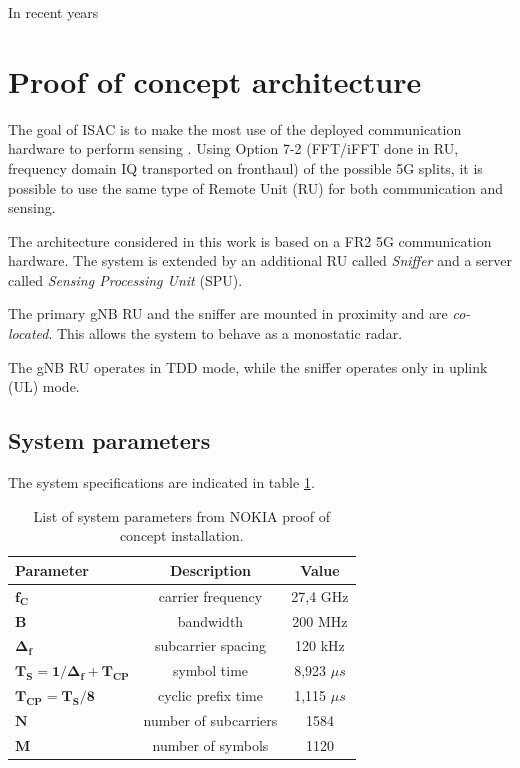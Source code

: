 	In recent years


\section{Proof of concept architecture}
	\label{sec:intro-PoCarchitecture}
	
	The goal of ISAC is to make the most use of the deployed communication hardware to perform sensing \cite{Wild_Grudnitsky_Mandelli_Henninger_Guan_Schaich_2023}. Using Option 7-2 (FFT/iFFT done in RU, frequency domain IQ transported on fronthaul) of the possible 5G splits, it is possible to use the same type of Remote Unit (RU) for both communication and sensing.
	
	The architecture considered in this work is based on a FR2 5G communication hardware. The system is extended by an additional RU called \textit{Sniffer} and a server called \textit{Sensing Processing Unit} (SPU).
	
	The primary gNB RU and the sniffer are mounted in proximity and are \textit{co-located}. This allows the system to behave as a monostatic radar.
	
	The gNB RU operates in TDD mode, while the sniffer operates only in uplink (UL) mode.
	
	\subsection{System parameters}
	
	The system specifications are indicated in table \ref{table:PoCparams}.
	
	\begin{table}[H]
		\centering 
		\begin{tabular}{|p{9em} c c |}
			\hline
			\rowcolor{bluepoli!40} %
			\textbf{Parameter} & \textbf{Description} & \textbf{Value}  \T\B \\
			\hline \hline
			$\bm{f_C}$ & carrier frequency & 27,4 GHz \T\B \\
			$\bm{B}$ & bandwidth & 200 MHz \T\B\\
			$\bm{\Delta_f}$ & subcarrier spacing & 120 kHz  \T\B\\
			$\bm{T_S = 1/\Delta_f + T_{CP}}$ & symbol time & 8,923 $\mu s$  \T\B\\
			$\bm{T_{CP} = T_S/8}$ & cyclic prefix time & 1,115 $\mu s$  \T\B\\
			$\bm{N}$ & number of subcarriers & 1584  \T\B\\
			$\bm{M}$ & number of symbols & 1120  \B\\
			
			\hline
		\end{tabular}
		\\[10pt]
		\caption{List of system parameters from NOKIA proof of concept installation.}
		\label{table:PoCparams}
	\end{table}
	
